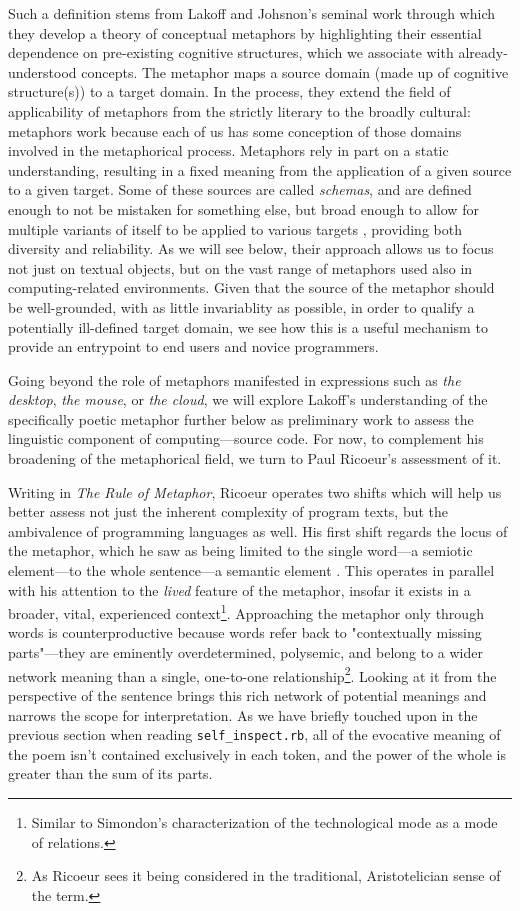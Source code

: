 Such a definition stems from Lakoff and Johsnon's seminal work through which they develop a theory of conceptual metaphors by highlighting their essential dependence on pre-existing cognitive structures, which we associate with already-understood concepts. The metaphor maps a source domain (made up of cognitive structure(s)) to a target domain. In the process, they extend the field of applicability of metaphors from the strictly literary to the broadly cultural: metaphors work because each of us has some conception of those domains involved in the metaphorical process. Metaphors rely in part on a static understanding, resulting in a fixed meaning from the application of a given source to a given target. Some of these sources are called \emph{schemas}, and are defined enough to not be mistaken for something else, but broad enough to allow for multiple variants of itself to be applied to various targets \citep{lakoff_metaphors_1980}, providing both diversity and reliability. As we will see below, their approach allows us to focus not just on textual objects, but on the vast range of metaphors used also in computing-related environments. Given that the source of the metaphor should be well-grounded, with as little invariablity as possible, in order to qualify a potentially ill-defined target domain, we see how this is a useful mechanism to provide an entrypoint to end users and novice programmers.

Going beyond the role of metaphors manifested in expressions such as \emph{the desktop}, \emph{the mouse}, or \emph{the cloud}, we will explore Lakoff's understanding of the specifically poetic metaphor further below as preliminary work to assess the linguistic component of computing—source code. For now, to complement his broadening of the metaphorical field, we turn to Paul Ricoeur's assessment of it.

Writing in \emph{The Rule of Metaphor}, Ricoeur operates two shifts which will help us better assess not just the inherent complexity of program texts, but the ambivalence of programming languages as well. His first shift regards the locus of the metaphor, which he saw as being limited to the single word—a semiotic element—to the whole sentence—a semantic element \citep{ricoeur_rule_2003}. This operates in parallel with his attention to the \emph{lived} feature of the metaphor, insofar it exists in a broader, vital, experienced context\footnote{Similar to Simondon's characterization of the technological mode as a mode of relations.}. Approaching the metaphor only through words is counterproductive because words refer back to "contextually missing parts"—they are eminently overdetermined, polysemic, and belong to a wider network meaning than a single, one-to-one relationship\footnote{As Ricoeur sees it being considered in the traditional, Aristotelician sense of the term.}. Looking at it from the perspective of the sentence brings this rich network of potential meanings and narrows the scope for interpretation. As we have briefly touched upon in the previous section when reading \lstinline{self_inspect.rb}, all of the evocative meaning of the poem isn't contained exclusively in each token, and the power of the whole is greater than the sum of its parts. %

